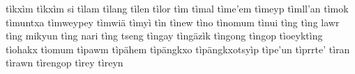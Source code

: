 \documentclass[a4paper]{article}
\begin{document}
tìkxìm\hspace{2mm}
tìkxìm si\hspace{2mm}
tìlam\hspace{2mm}
tìlang\hspace{2mm}
tìlen\hspace{2mm}
tìlor\hspace{2mm}
tìm\hspace{2mm}
tìmal\hspace{2mm}
tìme'em\hspace{2mm}
tìmeyp\hspace{2mm}
tìmll'an\hspace{2mm}
tìmok\hspace{2mm}
tìmuntxa\hspace{2mm}
tìmweypey\hspace{2mm}
tìmwiä\hspace{2mm}
tìmyì\hspace{2mm}
tìn\hspace{2mm}
tìnew\hspace{2mm}
tìno\hspace{2mm}
tìnomum\hspace{2mm}
tìnui\hspace{2mm}
tìng\hspace{2mm}
tìng lawr\hspace{2mm}
tìng mikyun\hspace{2mm}
tìng nari\hspace{2mm}
tìng tseng\hspace{2mm}
tìngay\hspace{2mm}
tìngäzìk\hspace{2mm}
tìngong\hspace{2mm}
tìngop\hspace{2mm}
tìoeyktìng\hspace{2mm}
tìohakx\hspace{2mm}
tìomum\hspace{2mm}
tìpawm\hspace{2mm}
tìpähem\hspace{2mm}
tìpängkxo\hspace{2mm}
tìpängkxotsyìp\hspace{2mm}
tìpe'un\hspace{2mm}
tìprrte'\hspace{2mm}
tìran\hspace{2mm}
tìrawn\hspace{2mm}
tìrengop\hspace{2mm}
tìrey\hspace{2mm}
tìreyn\hspace{2mm}
\end{document}
